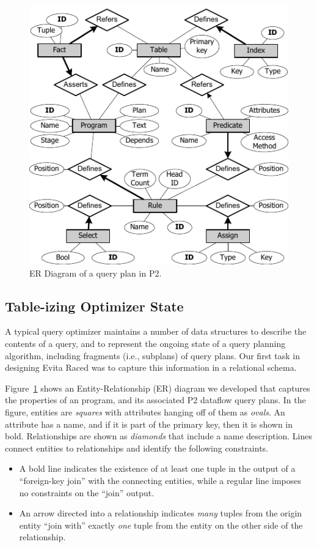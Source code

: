 \begin{figure}
\ssp
\begin{center}
\includegraphics[scale=1.2]{figures/ERDiagram}
\caption{ER Diagram of a query plan in P2.}
\label{ch:evita:fig:p2er}
\end{center}
\end{figure}

\subsection{Table-izing Optimizer State} 
\label{ch:evita:sec:catalog}

A typical query optimizer maintains a number of data structures to describe the
contents of a query, and to represent the ongoing state of a query planning
algorithm, including fragments (i.e., subplans) of query plans.  Our first task
in designing Evita Raced was to capture this information in a relational
schema.

Figure~\ref{ch:evita:fig:p2er} shows an Entity-Relationship (ER) diagram we
developed that captures the properties of an \OVERLOG program, and its
associated P2 dataflow query plans.  In the figure, entities are {\em squares} with
attributes hanging off of them as {\em ovals}.  An attribute has a name, and if it is
part of the primary key, then it is shown in bold.  Relationships are shown as
{\em diamonds} that include a name description.  Lines connect entities to relationships 
and identify the following constraints.
\begin{itemize}
    \ssp
  \item A bold line indicates the existence of at least one tuple in the output
    of a ``foreign-key join'' with the connecting entities, while a regular line
    imposes no constraints on the ``join'' output.
  \item An arrow directed into a relationship indicates {\em many} tuples from
    the origin entity ``join with'' exactly {\em one} tuple from the entity on
    the other side of the relationship.
\end{itemize}

